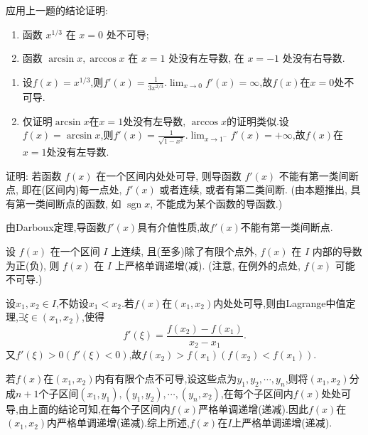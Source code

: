 \begin{exercise}[3.3.14]
    应用上一题的结论证明:
    \begin{enumerate}
        \item 函数 $x^{1/3}$ 在 $x=0$ 处不可导;
        \item 函数 $\arcsin x, \arccos x$ 在 $x=1$ 处没有左导数, 在 $x=-1$ 处没有右导数.
    \end{enumerate}
\end{exercise}

\begin{solution}
    \begin{enumerate}
        \item 设$f(x) = x^{1/3}$,则$f'(x) = \frac{1}{3x^{2/3}}$.$\lim_{x \to 0} f'(x) = \infty$,故$f(x)$在$x = 0$处不可导.
        \item 仅证明$\arcsin x$在$x = 1$处没有左导数, $\arccos x$的证明类似.设$f(x) = \arcsin x$,则$f'(x) = \frac{1}{\sqrt{1-x^2}}$.$\lim_{x \to 1^-} f'(x) = +\infty$,故$f(x)$在$x = 1$处没有左导数.
    \end{enumerate}
\end{solution}

\begin{exercise}[3.3.15]
    证明: 若函数 $f(x)$ 在一个区间内处处可导, 则导函数 $f'(x)$ 不能有第一类间断点, 即在(区间内)每一点处, $f'(x)$ 或者连续, 或者有第二类间断. (由本题推出, 具有第一类间断点的函数, 如 $\operatorname{sgn} x$, 不能成为某个函数的导函数.)
\end{exercise}

\begin{solution}
    由Darboux定理,导函数$f'(x)$具有介值性质,故$f'(x)$不能有第一类间断点.
\end{solution}

\begin{exercise}[3.3.16]\label{ex:3.3.16}
    设 $f(x)$ 在一个区间 $I$ 上连续, 且(至多)除了有限个点外, $f(x)$ 在 $I$ 内部的导数为正(负), 则 $f(x)$ 在 $I$ 上严格单调递增(减). (注意, 在例外的点处, $f(x)$ 可能不可导.)
\end{exercise}

\begin{solution}
    设$x_1,x_2 \in I$,不妨设$x_1 < x_2$.若$f(x)$在$(x_1,x_2)$内处处可导,则由Lagrange中值定理,$\exists \xi \in (x_1,x_2)$,使得
    $$
        f'(\xi) = \frac{f(x_2)-f(x_1)}{x_2-x_1}.
    $$
    又$f'(\xi) > 0 (f'(\xi) < 0)$,故$f(x_2) > f(x_1) (f(x_2) < f(x_1))$.

    若$f(x)$在$(x_1,x_2)$内有有限个点不可导,设这些点为$y_1,y_2,\cdots,y_n$,则将$(x_1,x_2)$分成$n+1$个子区间$(x_1,y_1),(y_1,y_2),\cdots,(y_n,x_2)$,在每个子区间内$f(x)$处处可导,由上面的结论可知,在每个子区间内$f(x)$严格单调递增(递减).因此$f(x)$在$(x_1,x_2)$内严格单调递增(递减).综上所述,$f(x)$在$I$上严格单调递增(递减).
\end{solution}

